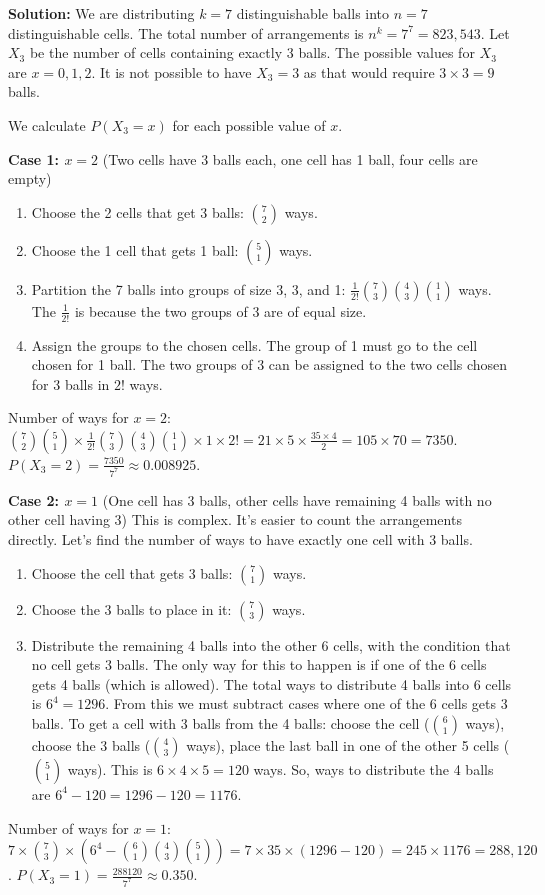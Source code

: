\noindent\textbf{Solution:}
We are distributing $k=7$ distinguishable balls into $n=7$ distinguishable cells. The total number of arrangements is $n^k = 7^7 = 823,543$.
Let $X_3$ be the number of cells containing exactly 3 balls. The possible values for $X_3$ are $x=0, 1, 2$. It is not possible to have $X_3=3$ as that would require $3 \times 3 = 9$ balls.

We calculate $P(X_3=x)$ for each possible value of $x$.

\textbf{Case 1: $x=2$} (Two cells have 3 balls each, one cell has 1 ball, four cells are empty)
\begin{enumerate}
    \item Choose the 2 cells that get 3 balls: $\binom{7}{2}$ ways.
    \item Choose the 1 cell that gets 1 ball: $\binom{5}{1}$ ways.
    \item Partition the 7 balls into groups of size 3, 3, and 1: $\frac{1}{2!}\binom{7}{3}\binom{4}{3}\binom{1}{1}$ ways. The $\frac{1}{2!}$ is because the two groups of 3 are of equal size.
    \item Assign the groups to the chosen cells. The group of 1 must go to the cell chosen for 1 ball. The two groups of 3 can be assigned to the two cells chosen for 3 balls in $2!$ ways.
\end{enumerate}
Number of ways for $x=2$: $\binom{7}{2}\binom{5}{1} \times \frac{1}{2!}\binom{7}{3}\binom{4}{3}\binom{1}{1} \times 1 \times 2! = 21 \times 5 \times \frac{35 \times 4}{2} = 105 \times 70 = 7350$.
$P(X_3=2) = \frac{7350}{7^7} \approx 0.008925$.

\textbf{Case 2: $x=1$} (One cell has 3 balls, other cells have remaining 4 balls with no other cell having 3)
This is complex. It's easier to count the arrangements directly.
Let's find the number of ways to have exactly one cell with 3 balls.
\begin{enumerate}
    \item Choose the cell that gets 3 balls: $\binom{7}{1}$ ways.
    \item Choose the 3 balls to place in it: $\binom{7}{3}$ ways.
    \item Distribute the remaining 4 balls into the other 6 cells, with the condition that no cell gets 3 balls. The only way for this to happen is if one of the 6 cells gets 4 balls (which is allowed). The total ways to distribute 4 balls into 6 cells is $6^4=1296$. From this we must subtract cases where one of the 6 cells gets 3 balls.
        To get a cell with 3 balls from the 4 balls: choose the cell ($\binom{6}{1}$ ways), choose the 3 balls ($\binom{4}{3}$ ways), place the last ball in one of the other 5 cells ($\binom{5}{1}$ ways). This is $6 \times 4 \times 5 = 120$ ways.
        So, ways to distribute the 4 balls are $6^4 - 120 = 1296 - 120 = 1176$.
\end{enumerate}
Number of ways for $x=1$: $7 \times \binom{7}{3} \times (6^4 - \binom{6}{1}\binom{4}{3}\binom{5}{1}) = 7 \times 35 \times (1296 - 120) = 245 \times 1176 = 288,120$.
$P(X_3=1) = \frac{288120}{7^7} \approx 0.350$.

